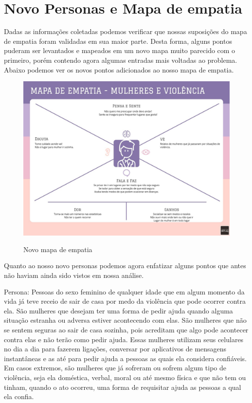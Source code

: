 \section{Novo Personas e Mapa de empatia}
Dadas as informações coletadas podemos verificar que nossas suposições do mapa de empatia foram validadas em sua maior parte. Desta forma, alguns pontos puderam ser levantados e mapeados em um novo mapa muito parecido com o primeiro, porém contendo agora algumas entradas mais voltadas ao problema. Abaixo podemos ver os novos pontos adicionados ao nosso mapa de empatia.
\begin{figure}[H]
  \begin{center}
  \includegraphics[width=0.6\linewidth]{images/mapa-empatia-novo.jpeg}\\
  \end{center}
  \caption[Nobo mapa de mepatia]{Novo mapa de empatia}
  \label{fig:novo-mapa-empatia}
\end{figure}

Quanto ao nosso novo personas podemos agora enfatizar alguns pontos que antes não haviam ainda sido vistos em nossa análise.

Persona: Pessoas do sexo feminino de qualquer idade que em algum momento da vida já teve receio de sair de casa por medo da violência que pode ocorrer contra ela. São mulheres que desejam ter uma forma de pedir ajuda quando alguma situação estranha ou adversa estiver acontecendo com elas. São mulheres que não se sentem seguras ao sair de casa sozinha, pois acreditam que algo pode acontecer contra elas e não terão como pedir ajuda. Essas mulheres utilizam seus celulares no dia a dia para fazerem ligações, conversar por aplicativos de mensagens instantâneas e as até para pedir ajuda a pessoas as quais ela considera confiáveis. Em casos extremos, são mulheres que já sofreram ou sofrem algum tipo de violência, seja ela doméstica, verbal, moral ou até mesmo física e que não tem ou tinham, quando o ato ocorreu, uma forma de requisitar ajuda as pessoas a qual ela confia.
